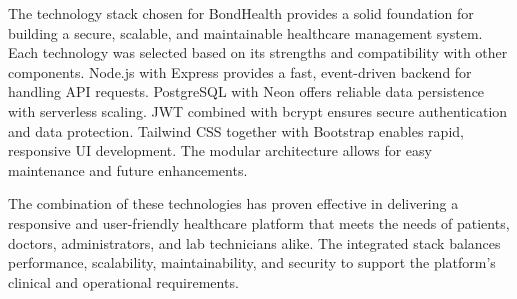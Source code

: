 \justifying
\noindent The technology stack chosen for BondHealth provides a solid foundation for building a secure, scalable, and maintainable healthcare management system. Each technology was selected based on its strengths and compatibility with other components. Node.js with Express provides a fast, event-driven backend for handling API requests. PostgreSQL with Neon offers reliable data persistence with serverless scaling. JWT combined with bcrypt ensures secure authentication and data protection. Tailwind CSS together with Bootstrap enables rapid, responsive UI development. The modular architecture allows for easy maintenance and future enhancements.

\justifying
\noindent The combination of these technologies has proven effective in delivering a responsive and user-friendly healthcare platform that meets the needs of patients, doctors, administrators, and lab technicians alike. The integrated stack balances performance, scalability, maintainability, and security to support the platform's clinical and operational requirements.